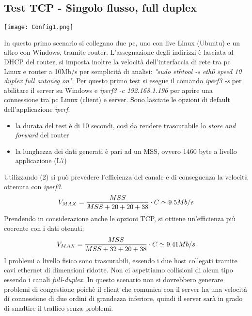 \documentclass[../lab2.tex]{subfiles}
\begin{document}
\subsection{Test TCP - Singolo flusso, full duplex}
\begin{center}
    \texttt{[image: Config1.png]}
\end{center}
     
    In questo primo scenario si collegano due pc, uno con live Linux (Ubuntu) e un altro con
    Windows, tramite router. L'assegnazione degli indirizzi è lasciata al DHCP del router,
    si imposta inoltre la velocità dell'interfaccia di rete tra pc Linux e router a 10Mb/s
    per semplicità di analisi: \textit{"sudo ethtool -s eth0 speed 10 duplex full autoneg on"}.
    Per questo primo test si esegue il comando \textit{iperf3 -s} per abilitare il server
    su Windows e \textit{iperf3 -c 192.168.1.196} per aprire una connessione tra pc Linux (client)
    e server. Sono lasciate le opzioni di default dell'applicazione \textit{iperf}:
    \begin{itemize}
        \item la durata del test è di 10 secondi, così da rendere trascurabile lo \textit{store and forward} del router
        \item la lunghezza dei dati generati è pari ad un MSS, ovvero 1460 byte a livello applicazione (L7)
    \end{itemize}
    Utilizzando (2) si può prevedere l'efficienza del canale e di conseguenza la velocità ottenuta con \textit{iperf3}.
    \begin{equation}
        \centering
        V_{MAX} = \frac{MSS}{MSS+20+20+38} \cdot C \simeq 9.5 Mb/s
    \end{equation}
    Prendendo in considerazione anche le opzioni TCP, si ottiene un'efficienza più coerente con i dati otenuti:
    \begin{equation}
        \centering
        V_{MAX} = \frac{MSS}{MSS+32+20+38} \cdot C \simeq 9.41 Mb/s
    \end{equation}
    I problemi a livello fisico sono trascurabili, essendo i due host collegati tramite cavi ethernet di dimensioni ridotte. 
    Non ci aspettiamo collisioni di alcun tipo essendo i canali \textit{full-duplex}. In questo scenario non 
    si dovrebbero generare problemi di congestione poichè il client che comunica con il server ha una velocità di 
    connessione di due ordini di grandezza inferiore, quindi il server sarà in grado di smaltire il traffico
    senza problemi.
\end{document}

